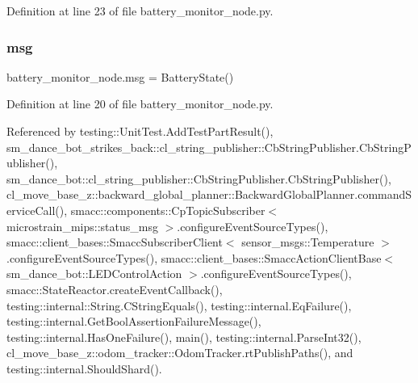 Definition at line 23 of file battery\+\_\+monitor\+\_\+node.\+py.

\mbox{\label{namespacebattery__monitor__node_ab1920c64448816edd4064e494275fdff}} 
\subsubsection{\texorpdfstring{msg}{msg}}
{\footnotesize\ttfamily battery\+\_\+monitor\+\_\+node.\+msg = Battery\+State()}



Definition at line 20 of file battery\+\_\+monitor\+\_\+node.\+py.



Referenced by testing\+::\+Unit\+Test.\+Add\+Test\+Part\+Result(), sm\+\_\+dance\+\_\+bot\+\_\+strikes\+\_\+back\+::cl\+\_\+string\+\_\+publisher\+::\+Cb\+String\+Publisher.\+Cb\+String\+Publisher(), sm\+\_\+dance\+\_\+bot\+::cl\+\_\+string\+\_\+publisher\+::\+Cb\+String\+Publisher.\+Cb\+String\+Publisher(), cl\+\_\+move\+\_\+base\+\_\+z\+::backward\+\_\+global\+\_\+planner\+::\+Backward\+Global\+Planner.\+command\+Service\+Call(), smacc\+::components\+::\+Cp\+Topic\+Subscriber$<$ microstrain\+\_\+mips\+::status\+\_\+msg $>$.\+configure\+Event\+Source\+Types(), smacc\+::client\+\_\+bases\+::\+Smacc\+Subscriber\+Client$<$ sensor\+\_\+msgs\+::\+Temperature $>$.\+configure\+Event\+Source\+Types(), smacc\+::client\+\_\+bases\+::\+Smacc\+Action\+Client\+Base$<$ sm\+\_\+dance\+\_\+bot\+::\+L\+E\+D\+Control\+Action $>$.\+configure\+Event\+Source\+Types(), smacc\+::\+State\+Reactor.\+create\+Event\+Callback(), testing\+::internal\+::\+String.\+C\+String\+Equals(), testing\+::internal.\+Eq\+Failure(), testing\+::internal.\+Get\+Bool\+Assertion\+Failure\+Message(), testing\+::internal.\+Has\+One\+Failure(), main(), testing\+::internal.\+Parse\+Int32(), cl\+\_\+move\+\_\+base\+\_\+z\+::odom\+\_\+tracker\+::\+Odom\+Tracker.\+rt\+Publish\+Paths(), and testing\+::internal.\+Should\+Shard().

\mbox{\label{namespacebattery__monitor__node_ab13957b56951b692f19d70ccac2e2511}} 
